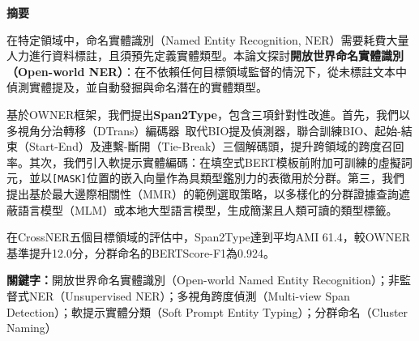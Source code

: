 \clearpage

{}
\begin{center}
    \textbf{\large 摘要}
\end{center}

在特定領域中，命名實體識別（Named Entity Recognition, NER）需要耗費大量人力進行資料標註，且須預先定義實體類型。本論文探討\textbf{開放世界命名實體識別（Open-world NER）}：在不依賴任何目標領域監督的情況下，從未標註文本中偵測實體提及，並自動發掘與命名潛在的實體類型。

基於OWNER框架，我們提出\textbf{Span2Type}，包含三項針對性改進。首先，我們以多視角分治轉移（DTrans）編碼器~\cite{zhang-etal-2024-dtrans}取代BIO提及偵測器，聯合訓練BIO、起始-結束（Start-End）及連繫-斷開（Tie-Break）三個解碼頭，提升跨領域的跨度召回率。其次，我們引入軟提示實體編碼：在填空式BERT模板前附加可訓練的虛擬詞元，並以\texttt{[MASK]}位置的嵌入向量作為具類型鑑別力的表徵用於分群。第三，我們提出基於最大邊際相關性（MMR）的範例選取策略，以多樣化的分群證據查詢遮蔽語言模型（MLM）或本地大型語言模型，生成簡潔且人類可讀的類型標籤。

在CrossNER五個目標領域的評估中，Span2Type達到平均AMI 61.4，較OWNER基準提升12.0分，分群命名的BERTScore-F1為0.924。

\vspace*{1cm}

\noindent\textbf{關鍵字：}開放世界命名實體識別（Open-world Named Entity Recognition）；非監督式NER（Unsupervised NER）；多視角跨度偵測（Multi-view Span Detection）；軟提示實體分類（Soft Prompt Entity Typing）；分群命名（Cluster Naming）

